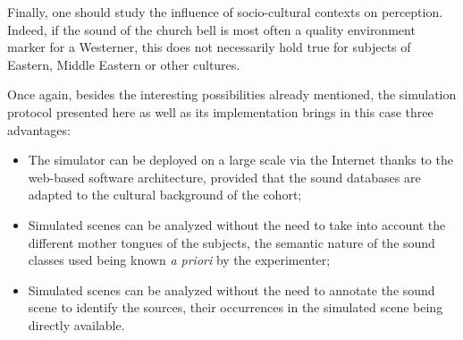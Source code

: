 \documentclass[12pt]{elsarticle}
\begin{document}
Finally, one should study the influence of socio-cultural contexts on perception. Indeed, if the sound of the church bell is most often a quality environment marker for a Westerner, this does not necessarily hold true for subjects of Eastern, Middle Eastern or other cultures.



Once again, besides the interesting possibilities already mentioned, the simulation protocol presented here as well as its implementation brings in this case three advantages:


\begin{itemize}
\item The simulator can be deployed on a large scale via the Internet thanks to the web-based software architecture, provided that the sound databases are adapted to the cultural background of the cohort;
\item Simulated scenes can be analyzed without the need to take into account the different mother tongues of the subjects, the semantic nature of the sound classes used being known \emph{a priori} by the experimenter;
\item Simulated scenes can be analyzed without the need to annotate the sound scene to identify the sources, their occurrences in the simulated scene being directly available.
\end{itemize}
\end{document}
